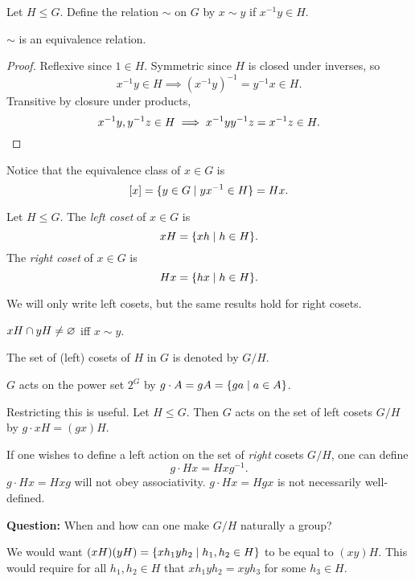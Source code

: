\begin{definition}
    Let $H \le G$.
    Define the relation $\sim$ on $G$ by $x \sim y$ if $x^{-1}y \in H$.
\end{definition}
\begin{lemma}
    $\sim$ is an equivalence relation.
\end{lemma}
\begin{proof}
    Reflexive since $1 \in H$.
    Symmetric since $H$ is closed under inverses, so \[
        x^{-1}y \in H \implies (x^{-1}y)^{-1} = y^{-1}x \in H.
    \] Transitive by closure under products, \[
        x^{-1}y, y^{-1}z \in H \implies x^{-1}y y^{-1}z = x^{-1}z \in H.
        \qedhere
    \]
\end{proof}
Notice that the equivalence class of $x \in G$ is \[
    [x] = \{y \in G \mid yx^{-1} \in H\} = Hx.
\]
\begin{definition*}[Coset] \label{def:coset}
    Let $H \le G$.
    The \emph{left coset} of $x \in G$ is \[
        xH = \{xh \mid h \in H\}.
    \] The \emph{right coset} of $x \in G$ is \[
        Hx = \{hx \mid h \in H\}.
    \]
\end{definition*}
We will only write left cosets, but the same results hold for right cosets.
\begin{corollary}
    $xH \cap yH \ne \varnothing$ iff $x \sim y$.
\end{corollary}

\begin{definition*}
    The set of (left) cosets of $H$ in $G$ is denoted by $G/H$.
\end{definition*}

\begin{examples}
    \item $G$ acts on the power set $2^G$ by
        $g \cdot A = gA = \{ga \mid a \in A\}$.
    \item Restricting this is useful.
        Let $H \le G$.
        Then $G$ acts on the set of left cosets $G/H$ by
        $g \cdot xH = (gx)H$.
    \item If one wishes to define a left action on the set of \emph{right}
    cosets $G/H$, one can define \[
        g \cdot Hx = Hxg^{-1}.
    \] $g \cdot Hx = Hxg$ will not obey associativity.
    $g \cdot Hx = Hgx$ is not necessarily well-defined.
\end{examples}

\textbf{Question:} When and how can one make $G/H$ naturally a group?

We would want $(xH) (yH) = \{xh_1 yh_2 \mid h_1, h_2 \in H\}$ to
be equal to $(xy)H$.
This would require for all $h_1, h_2 \in H$ that $xh_1yh_2 = xyh_3$
for some $h_3 \in H$.

